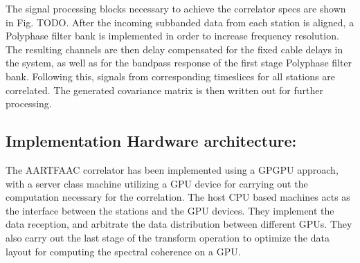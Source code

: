 \documentclass{ws-jai}
\begin{document}
The signal processing blocks necessary to achieve the correlator specs are shown
in Fig. TODO.  After the incoming subbanded data from each station is aligned, a
Polyphase filter bank is implemented  in order to increase frequency resolution.
The resulting channels are then delay  compensated for the fixed cable delays in
the system, as  well as for the  bandpass response of the  first stage Polyphase
filter  bank.  Following  this, signals  from corresponding  timeslices for  all
stations are correlated. The generated covariance matrix is then written out for
further processing.

\subsection  {Implementation  Hardware  architecture:} 
The AARTFAAC  correlator has  been implemented  using a  GPGPU approach,  with a
server class  machine utilizing a  GPU device  for carrying out  the computation
necessary  for  the correlation.   The  host  CPU  based  machines acts  as  the
interface between  the stations and  the GPU  devices.  They implement  the data
reception, and arbitrate the data distribution between different GPUs. They also
carry out the last stage of the  transform operation to optimize the data layout
for computing the spectral coherence on a GPU.

\end{document}
